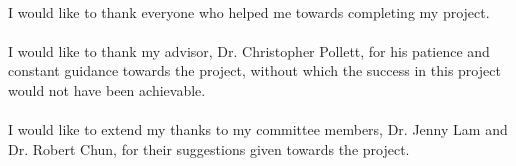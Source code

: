 \paragraph{}
I would like to thank everyone who helped me towards completing my project.

\paragraph{}
I would like to thank my advisor, Dr. Christopher Pollett, for his patience and constant guidance towards the project, without which the success in this project would not have been achievable.

\paragraph{}
I would like to extend my thanks to my committee members, Dr. Jenny Lam and Dr. Robert Chun, for their suggestions given towards the project.


